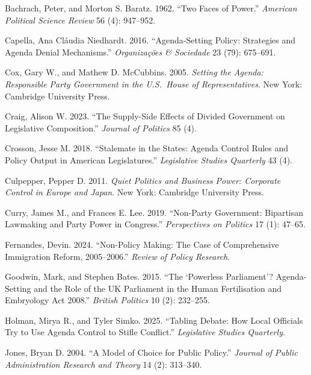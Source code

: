 \documentclass[11pt]{article}
\begin{document}
\begin{description}

\item Bachrach, Peter, and Morton S. Baratz. 1962. ``Two Faces of Power.'' \textit{American Political Science Review} 56 (4): 947--952.

\item Capella, Ana Cl\'{a}udia Niedhardt. 2016. ``Agenda-Setting Policy: Strategies and Agenda Denial Mechanisms.'' \textit{Organiza\c{c}\~{o}es \& Sociedade} 23 (79): 675--691.

\item Cox, Gary W., and Mathew D. McCubbins. 2005. \textit{Setting the Agenda: Responsible Party Government in the U.S.\ House of Representatives}. New York: Cambridge University Press.

\item Craig, Alison W. 2023. ``The Supply-Side Effects of Divided Government on Legislative Composition.'' \textit{Journal of Politics} 85 (4).

\item Crosson, Jesse M. 2018. ``Stalemate in the States: Agenda Control Rules and Policy Output in American Legislatures.'' \textit{Legislative Studies Quarterly} 43 (4).

\item Culpepper, Pepper D. 2011. \textit{Quiet Politics and Business Power: Corporate Control in Europe and Japan}. New York: Cambridge University Press.

\item Curry, James M., and Frances E. Lee. 2019. ``Non-Party Government: Bipartisan Lawmaking and Party Power in Congress.'' \textit{Perspectives on Politics} 17 (1): 47--65.

\item Fernandes, Devin. 2024. ``Non-Policy Making: The Case of Comprehensive Immigration Reform, 2005--2006.'' \textit{Review of Policy Research}.

\item Goodwin, Mark, and Stephen Bates. 2015. ``The `Powerless Parliament'? Agenda-Setting and the Role of the UK Parliament in the Human Fertilisation and Embryology Act 2008.'' \textit{British Politics} 10 (2): 232--255.

\item Holman, Mirya R., and Tyler Simko. 2025. ``Tabling Debate: How Local Officials Try to Use Agenda Control to Stifle Conflict.'' \textit{Legislative Studies Quarterly}.

\item Jones, Bryan D. 2004. ``A Model of Choice for Public Policy.'' \textit{Journal of Public Administration Research and Theory} 14 (2): 313--340.


\end{description}
\end{document}
